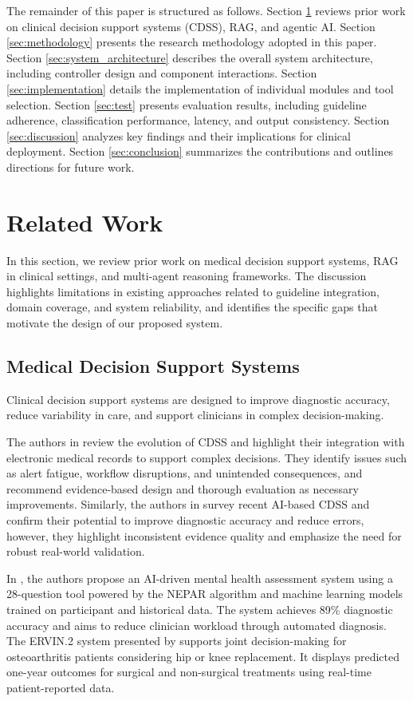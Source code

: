 \documentclass[preprint,12pt]{elsarticle}
\begin{document}
The remainder of this paper is structured as follows. Section \ref{sec:related_work} reviews prior work on clinical decision support systems (CDSS), RAG, and agentic AI. Section \ref{sec:methodology} presents the research methodology adopted in this paper. Section \ref{sec:system_architecture} describes the overall system architecture, including controller design and component interactions. Section \ref{sec:implementation} details the implementation of individual modules and tool selection. Section \ref{sec:test} presents evaluation results, including guideline adherence, classification performance, latency, and output consistency. Section \ref{sec:discussion} analyzes key findings and their implications for clinical deployment. Section \ref{sec:conclusion} summarizes the contributions and outlines directions for future work.

\section{Related Work}
\label{sec:related_work}

In this section, we review prior work on medical decision support systems, RAG in clinical settings, and multi-agent reasoning frameworks. The discussion highlights limitations in existing approaches related to guideline integration, domain coverage, and system reliability, and identifies the specific gaps that motivate the design of our proposed system.


\subsection{Medical Decision Support Systems}

Clinical decision support systems are designed to improve diagnostic accuracy, reduce variability in care, and support clinicians in complex decision-making.

The authors in \cite{r9} review the evolution of CDSS and highlight their integration with electronic medical records to support complex decisions. They identify issues such as alert fatigue, workflow disruptions, and unintended consequences, and recommend evidence-based design and thorough evaluation as necessary improvements. Similarly, the authors in \cite{r13} survey recent AI-based CDSS and confirm their potential to improve diagnostic accuracy and reduce errors, however, they highlight inconsistent evidence quality and emphasize the need for robust real-world validation.

In \cite{r10}, the authors propose an AI-driven mental health assessment system using a 28-question tool powered by the NEPAR algorithm and machine learning models trained on participant and historical data. The system achieves 89\% diagnostic accuracy and aims to reduce clinician workload through automated diagnosis.
The ERVIN.2 system presented by \cite{r11} supports joint decision-making for osteoarthritis patients considering hip or knee replacement. It displays predicted one-year outcomes for surgical and non-surgical treatments using real-time patient-reported data.
\end{document}
